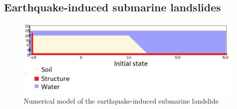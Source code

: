 \documentclass[preprint,12pt]{elsarticle}
\begin{document}
\subsection{\textsf{Earthquake-induced submarine landslides}}
%
%
\begin{figure}[H]
\center
\includegraphics[scale=0.5]{schematic.jpeg}
\caption{Numerical model of the earthquake-induced submarine landslide}
\label{fig:scheme}
\end {figure}
%
%
\end{document}
